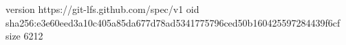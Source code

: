 version https://git-lfs.github.com/spec/v1
oid sha256:e3e60eed3a10c405a85da677d78ad5341775796ced50b160425597284439f6cf
size 6212
